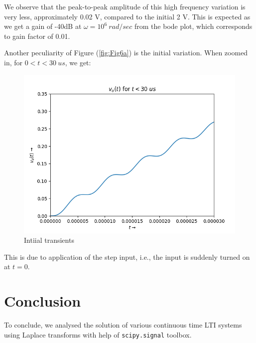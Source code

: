 \documentclass[11pt, a4paper, twoside]{article}
\begin{document}
    We observe that the peak-to-peak amplitude of this high frequency variation is very less, approximately 0.02 V, compared to the initial 2 V. This is expected as we get a gain of -40dB at $\omega=10^6\ rad/sec$ from the bode plot, which corresponds to gain factor of 0.01.
    
    Another peculiarity of Figure (\ref{fig:Fig6a}) is the initial variation. When zoomed in, for $0<t<30\ us$, we get:
    \begin{figure}[H]
        \centering
        \includegraphics[scale=0.7]{Fig 6(b).png}
        \caption{Intiial transients}
        \label{fig:Fig6b}
    \end{figure}
    
    This is due to application of the step input, i.e., the input is suddenly turned on at $t=0$.
\section{Conclusion}
To conclude, we analysed the solution of various continuous time LTI systems using Laplace transforms with help of \texttt{scipy.signal} toolbox.
\end{document}

